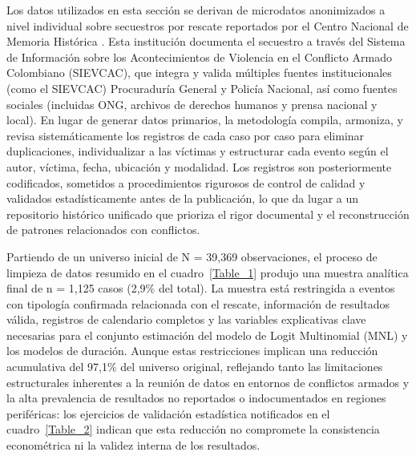 \documentclass[12pt]{article}
\providecommand{\textcite}{\citet}
\theoremstyle{definition}
\theoremstyle{remark}
\newcommand{\1}{\mathbf{1}}
\begin{document}
Los datos utilizados en esta sección se derivan de microdatos anonimizados a nivel individual sobre secuestros por rescate reportados por el Centro Nacional de Memoria Histórica \textcite{cnmh_datos}. Esta institución documenta el secuestro a través del Sistema de Información sobre los Acontecimientos de Violencia en el Conflicto Armado Colombiano (SIEVCAC), que integra y valida múltiples fuentes institucionales (como el SIEVCAC) Procuraduría General y Policía Nacional, así como fuentes sociales (incluidas ONG, archivos de derechos humanos y prensa nacional y local). En lugar de generar datos primarios, la metodología compila, armoniza, y revisa sistemáticamente los registros de cada caso por caso para eliminar duplicaciones, individualizar a las víctimas y estructurar cada evento según el autor, víctima, fecha, ubicación y modalidad. Los registros son posteriormente codificados, sometidos a procedimientos rigurosos de control de calidad y validados estadísticamente antes de la publicación, lo que da lugar a un repositorio histórico unificado que prioriza el rigor documental y el reconstrucción de patrones relacionados con conflictos.

Partiendo de un universo inicial de N = 39{,}369 observaciones, el proceso de limpieza de datos resumido en el cuadro~\ref{Table_1} produjo una muestra analítica final de n = 1{,}125 casos (2,9\% del total). La muestra está restringida a eventos con tipología confirmada relacionada con el rescate, información de resultados válida, registros de calendario completos y las variables explicativas clave necesarias para el conjunto estimación del modelo de Logit Multinomial (MNL) y los modelos de duración. Aunque estas restricciones implican una reducción acumulativa del 97,1\% del universo original, reflejando tanto las limitaciones estructurales inherentes a la reunión de datos en entornos de conflictos armados y la alta prevalencia de resultados no reportados o indocumentados en regiones periféricas: los ejercicios de validación estadística notificados en el cuadro~\ref{Table_2} indican que esta reducción no compromete la consistencia econométrica ni la validez interna de los resultados.
\end{document}
